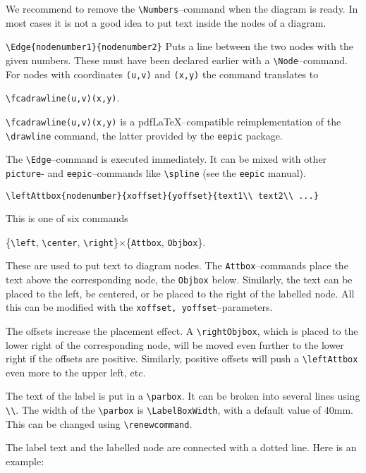 \documentclass[12pt]{article}
\begin{document}
\begin{description}
We recommend to remove the \verb|\Numbers|--command when the diagram is
ready. In most cases it is not a good idea to put text inside the nodes of a diagram. 

\item[]\verb|\Edge{nodenumber1}{nodenumber2}|\quad
Puts a line between the two nodes with the given numbers. These must have been
declared earlier with a \verb|\Node|--command. For nodes with coordinates
\verb|(u,v)| and \verb|(x,y)| the command translates to 
\begin{center}\verb|\fcadrawline(u,v)(x,y)|.\end{center}
\verb|\fcadrawline(u,v)(x,y)| is a pdf\LaTeX--compatible reimplementation of
the \verb|\drawline| command, the latter provided by the \texttt{eepic}
package. 
 
The \verb|\Edge|--command is executed immediately. It can be mixed with other
\texttt{picture}- and \texttt{eepic}--commands like \verb|\spline|
(see the \texttt{eepic} manual).  

\item[]\verb|\leftAttbox{nodenumber}{xoffset}{yoffset}{text1\\ text2\\ ...}|\quad\par
This is one of six commands 
\begin{center}
  \{\verb|\left|, \verb|\center|, \verb|\right|\}$\times$\{\verb|Attbox|,
  \verb|Objbox|\}.\end{center}  These are used to put
text to diagram nodes. The \verb|Attbox|--commands place the text above the
corresponding node, the \verb|Objbox| below. Similarly, the text can be placed
to the left, be centered, or be placed to the right of the labelled node. All
this can be modified with the \texttt{xoffset, yoffset}--parameters. 

The offsets increase the placement effect. A \verb|\rightObjbox|, which is
placed to the lower right of the corresponding node, will be moved even
further to the lower right if the offsets are positive. Similarly, positive
offsets will push a \verb|\leftAttbox| even more to the upper left, etc.

The text of the label is put in a \verb|\parbox|. It can be broken into
several lines using \verb|\\|. The width of the \verb|\parbox| is
\verb|\LabelBoxWidth|, with a default value of 40mm. This can be changed using
\verb|\renewcommand|.

The label text and the labelled node are connected with a dotted line.
Here is an example:


\end{description}
\end{document}
